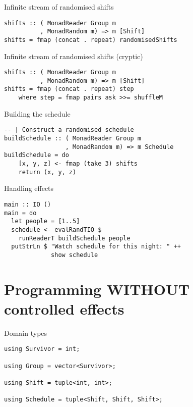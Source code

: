 \begin{frame}[fragile]{Infinite stream of randomised shifts}
  \begin{block}{}
  \begin{verbatim}
shifts :: ( MonadReader Group m
          , MonadRandom m) => m [Shift]
shifts = fmap (concat . repeat) randomisedShifts
  \end{verbatim}
  \end{block}
\end{frame}

\begin{frame}[fragile]{Infinite stream of randomised shifts (cryptic)}
  \begin{block}{}
  \begin{verbatim}
shifts :: ( MonadReader Group m
          , MonadRandom m) => m [Shift]
shifts = fmap (concat . repeat) step
    where step = fmap pairs ask >>= shuffleM
  \end{verbatim}
  \end{block}
\end{frame}

\begin{frame}[fragile]{Building the schedule}
  \begin{block}{}
  \begin{verbatim}
-- | Construct a randomised schedule
buildSchedule :: ( MonadReader Group m
                 , MonadRandom m) => m Schedule
buildSchedule = do
    [x, y, z] <- fmap (take 3) shifts
    return (x, y, z)
  \end{verbatim}
  \end{block}
\end{frame}

\begin{frame}[fragile]{Handling effects}
  \begin{block}{}
  \begin{verbatim}
main :: IO ()
main = do
  let people = [1..5]
  schedule <- evalRandTIO $
    runReaderT buildSchedule people
  putStrLn $ "Watch schedule for this night: " ++
             show schedule
  \end{verbatim}
  \end{block}
\end{frame}

\section{Programming WITHOUT controlled effects}

\begin{frame}[fragile]{Domain types}
  \begin{block}{}
  \begin{verbatim}
using Survivor = int;

using Group = vector<Survivor>;

using Shift = tuple<int, int>;

using Schedule = tuple<Shift, Shift, Shift>;
  \end{verbatim}
  \end{block}
\end{frame}

